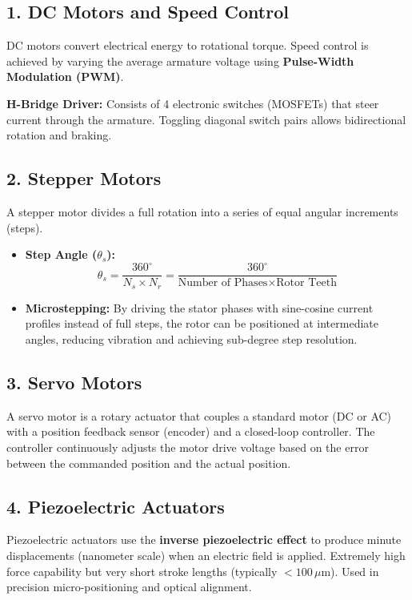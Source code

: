 \documentclass[12pt,a4paper]{article}
\begin{document}
\subsection{1. DC Motors and Speed Control}
DC motors convert electrical energy to rotational torque. Speed control is achieved by varying the average armature voltage using \textbf{Pulse-Width Modulation (PWM)}.

\textbf{H-Bridge Driver:} Consists of 4 electronic switches (MOSFETs) that steer current through the armature. Toggling diagonal switch pairs allows bidirectional rotation and braking.

\subsection{2. Stepper Motors}
A stepper motor divides a full rotation into a series of equal angular increments (steps).
\begin{itemize}[leftmargin=*, itemsep=2.5pt]
  \item \textbf{Step Angle ($\theta_s$):}
    \[
    \theta_s = \frac{360^\circ}{N_s \times N_r} = \frac{360^\circ}{\text{Number of Phases} \times \text{Rotor Teeth}}
    \]
  \item \textbf{Microstepping:} By driving the stator phases with sine-cosine current profiles instead of full steps, the rotor can be positioned at intermediate angles, reducing vibration and achieving sub-degree step resolution.
\end{itemize}

\subsection{3. Servo Motors}
A servo motor is a rotary actuator that couples a standard motor (DC or AC) with a position feedback sensor (encoder) and a closed-loop controller. The controller continuously adjusts the motor drive voltage based on the error between the commanded position and the actual position.

\subsection{4. Piezoelectric Actuators}
Piezoelectric actuators use the \textbf{inverse piezoelectric effect} to produce minute displacements (nanometer scale) when an electric field is applied. Extremely high force capability but very short stroke lengths (typically $<100\,\mu$m). Used in precision micro-positioning and optical alignment.
\end{document}

